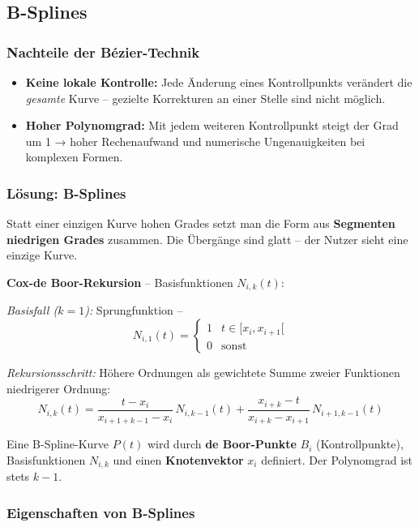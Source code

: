 \documentclass[12pt, a4paper]{article}
\begin{document}
\subsection{B-Splines}

\subsubsection*{Nachteile der Bézier-Technik}
\begin{itemize}
  \item \textbf{Keine lokale Kontrolle:} Jede Änderung eines Kontrollpunkts verändert die \textit{gesamte} Kurve -- gezielte Korrekturen an einer Stelle sind nicht möglich.
  \item \textbf{Hoher Polynomgrad:} Mit jedem weiteren Kontrollpunkt steigt der Grad um 1 → hoher Rechenaufwand und numerische Ungenauigkeiten bei komplexen Formen.
\end{itemize}

\subsubsection*{Lösung: B-Splines}

Statt einer einzigen Kurve hohen Grades setzt man die Form aus \textbf{Segmenten niedrigen Grades} zusammen. Die Übergänge sind glatt -- der Nutzer sieht eine einzige Kurve.

\textbf{Cox-de Boor-Rekursion} -- Basisfunktionen $N_{i,k}(t)$:

\textit{Basisfall ($k=1$):} Sprungfunktion --
\[
  N_{i,1}(t) = \begin{cases} 1 & t \in [x_i, x_{i+1}[ \\ 0 & \text{sonst} \end{cases}
\]

\textit{Rekursionsschritt:} Höhere Ordnungen als gewichtete Summe zweier Funktionen niedrigerer Ordnung:
\[
  N_{i,k}(t) = \frac{t - x_i}{x_{i+1+k-1} - x_i}\,N_{i,k-1}(t) + \frac{x_{i+k} - t}{x_{i+k} - x_{i+1}}\,N_{i+1,k-1}(t)
\]

Eine B-Spline-Kurve $P(t)$ wird durch \textbf{de Boor-Punkte} $B_i$ (Kontrollpunkte), Basisfunktionen $N_{i,k}$ und einen \textbf{Knotenvektor} $x_i$ definiert. Der Polynomgrad ist stets $k-1$.

\subsubsection*{Eigenschaften von B-Splines}
\end{document}
